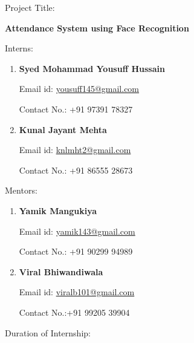 \documentclass[14pt]{article}
\author{Kunal Mehta}
\title{}
\begin{document}
\begin{center}
{\Large Project Title:}
\end{center}

\begin{center}
{\Huge \textbf{Attendance System using Face Recognition}\\}
\end{center}

\begin{center}

\end{center}
\begin{center}
{\LARGE Interns:}

\begin{enumerate}
	\item {\LARGE \textbf{Syed Mohammad Yousuff Hussain}}


{\raggedright
{\Large Email id:
\href{mailto:yousuff145@gmail.com}{yousuff145@gmail.com}}
}

{\raggedright
{\Large Contact No.: +91 97391 78327}
}


	\item {\LARGE \textbf{Kunal Jayant Mehta}}


{\raggedright
{\Large Email id:
\href{mailto:knlmht2@gmail.com}{knlmht2@gmail.com}}
}


{\raggedright
{\Large Contact No.: +91 86555 28673}
}
\end{enumerate}
\begin{center}
{\LARGE Mentors:}
\end{center}

\begin{enumerate}
	\item {\LARGE     \textbf{Yamik Mangukiya}}


{\raggedright
{\Large     Email id:
\href{mailto:yamik143@gmail.com}{yamik143@gmail.com}}
}

{\raggedright
{\Large     Contact No.: +91 90299 94989}
}


	\item {\LARGE     \textbf{Viral Bhiwandiwala}}


{\raggedright
{\LARGE     }{\Large Email id: \href{mailto:viralb101@gmail.com}{viralb101@gmail.com}}
}

{\raggedright
{\Large     Contact No.:+91 99205 39904}
}
\end{enumerate}
\end{center}
\begin{center}
{\large Duration of Internship:}
\end{center}
\end{document}
